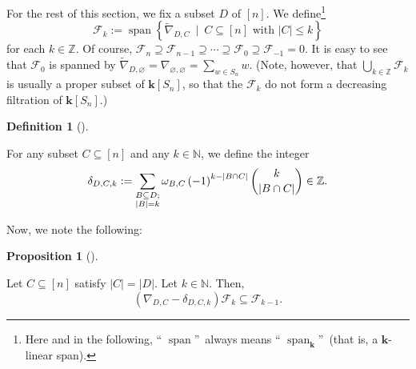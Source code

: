 \documentclass[numbers=enddot,12pt,final,onecolumn,notitlepage]{scrartcl}%
\numberwithin{exer}{subsection}
\theoremstyle{definition}
\newtheorem{prop}[theo]{Proposition}
\newenvironment{proposition}[1][]
{\begin{prop}[#1]\begin{leftbar}}
{\end{leftbar}\end{prop}}
\newtheorem{defi}[theo]{Definition}
\newenvironment{definition}[1][]
{\begin{defi}[#1]\begin{leftbar}}
{\end{leftbar}\end{defi}}
\let\sumnonlimits\sum
\let\cupnonlimits\bigcup
\renewcommand{\sum}{\sumnonlimits\limits}
\renewcommand{\bigcup}{\cupnonlimits\limits}
\begin{document}
For the rest of this section, we fix a subset $D$ of $\left[  n\right]  $. We
define\footnote{Here and in the following, \textquotedblleft%
$\operatorname*{span}$\textquotedblright\ always means \textquotedblleft%
$\operatorname*{span}\nolimits_{\mathbf{k}}$\textquotedblright\ (that is, a
$\mathbf{k}$-linear span).}%
\[
\mathcal{F}_{k}:=\operatorname*{span}\left\{  \widetilde{\nabla}_{D,C}%
\ \mid\ C\subseteq\left[  n\right]  \text{ with }\left\vert C\right\vert \leq
k\right\}
\]
for each $k\in\mathbb{Z}$. Of course, $\mathcal{F}_{n}\supseteq\mathcal{F}%
_{n-1}\supseteq\cdots\supseteq\mathcal{F}_{0}\supseteq\mathcal{F}_{-1}=0$. It
is easy to see that $\mathcal{F}_{0}$ is spanned by $\widetilde{\nabla
}_{D,\varnothing}=\nabla_{\varnothing,\varnothing}=\sum_{w\in S_{n}}w$. (Note,
however, that $\bigcup_{k\in\mathbb{Z}}\mathcal{F}_{k}$ is usually a proper
subset of $\mathbf{k}\left[  S_{n}\right]  $, so that the $\mathcal{F}_{k}$ do
not form a decreasing filtration of $\mathbf{k}\left[  S_{n}\right]  $.)

\begin{definition}
For any subset $C\subseteq\left[  n\right]  $ and any $k\in\mathbb{N}$, we
define the integer%
\[
\delta_{D,C,k}:=\sum\limits_{\substack{B\subseteq D;\\\left\vert B\right\vert
=k}}\omega_{B,C}\left(  -1\right)  ^{k-\left\vert B\cap C\right\vert }%
\dbinom{k}{\left\vert B\cap C\right\vert }\in\mathbb{Z}.
\]

\end{definition}

Now, we note the following:

\begin{proposition}
\label{prop.Fk.1}Let $C\subseteq\left[  n\right]  $ satisfy $\left\vert
C\right\vert =\left\vert D\right\vert $. Let $k\in\mathbb{N}$. Then,%
\[
\left(  \nabla_{D,C}-\delta_{D,C,k}\right)  \mathcal{F}_{k}\subseteq
\mathcal{F}_{k-1}.
\]

\end{proposition}
\end{document}
